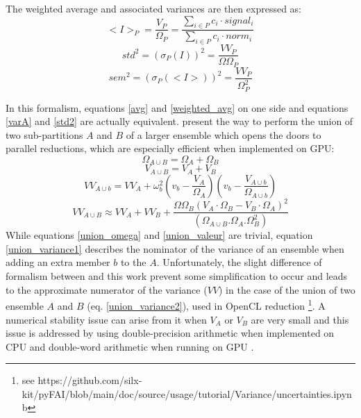 \documentclass[preprint]{iucr}              %
\begin{document}
The weighted average and associated variances are then expressed as:
\begin{equation}
\label{weighted_avg}
<I>_P = \frac{V_{P}}{\Omega_{P}} =  \frac{\sum\limits_{i \in P} c_i \cdot signal_i}
                        {\sum\limits_{i \in P} c_i \cdot norm_i} 
\end{equation}
\begin{equation}
\label{std2}
std^2 = (\sigma_P(I))^2 = \frac{VV_{P}}{\Omega\Omega_{P}}
\end{equation}
\begin{equation}
\label{sem2}
sem^2 = (\sigma_P(<I>))^2 = \frac{VV_{P}}{\Omega_{P}^2}
\end{equation}

In this formalism, equations \ref{avg} and \ref{weighted_avg} on one side and equations \ref{varA} and \ref{std2} are actually equivalent.
 present the way to perform the union of two sub-partitions $A$ and $B$ of a larger ensemble which opens the doors to parallel reductions, which are especially efficient when implemented on GPU:
\begin{equation}
\label{union_omega}
\Omega_{A \cup B} =  \Omega_{A} + \Omega_{B} 
\end{equation}
\begin{equation}
\label{union_valeur}
V_{A \cup B} =  V_{A} + V_{B} 
\end{equation}
\begin{equation}
\label{union_variance1}
VV_{A \cup b} =  VV_{A}  +  \omega_b^2(v_b-\frac{V_A}{\Omega_A})(v_b-\frac{V_{A\cup b}}{\Omega_{A\cup b}})
\end{equation}
\begin{equation}
\label{union_variance2}
VV_{A \cup B} \approx  VV_{A} + VV_{B} +  \frac{\Omega\Omega_{B}(V_A\cdot \Omega_B-V_B\cdot \Omega_A)^2}{(\Omega_{A\cup B}.\Omega_A.\Omega_B^2)}
\end{equation}
While equations \ref{union_omega} and \ref{union_valeur} are trivial, equation \ref{union_variance1} describes the nominator of the variance of an ensemble when adding an extra member $b$ to the $A$.
Unfortunately, the slight difference of formalism between  and this work prevent some simplification to occur and leads to the approximate numerator of the variance ($VV$) in the case of the union of two ensemble $A$ and $B$ (eq. \ref{union_variance2}), used in OpenCL reduction \footnote{see https://github.com/silx-kit/pyFAI/blob/main/doc/source/usage/tutorial/Variance/uncertainties.ipynb}.
A numerical stability issue can arise from it when $V_A$ or $V_B$ are very small and this issue is addressed by using double-precision arithmetic when implemented on CPU and double-word arithmetic when running on GPU \cite{double_word}.
\end{document}
